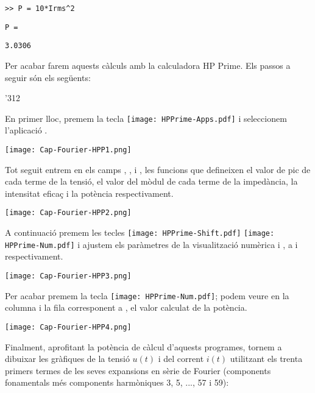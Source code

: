 \begin{exemple}
    \hspace{1cm}\texttt{>{}> P = 10*Irms\^{}2}

    \hspace{1cm}\texttt{P =}

    \hspace{1cm}\texttt{\phantom{Irms }3.0306}\newline


    Per acabar farem aquests càlculs amb la calculadora \textsf{HP Prime}.
     Els passos a seguir són els següents:

    \begin{dingautolist}{'312}

        \item En primer lloc, premem la tecla \texttt{[image: HPPrime-Apps.pdf]} i seleccionem l'aplicació .

             \texttt{[image: Cap-Fourier-HPP1.png]}

        \item Tot seguit entrem en els camps , ,  i , les funcions que defineixen el valor de pic de cada terme de la tensió,  el valor del mòdul de cada terme de la impedància,  la intensitat eficaç i la potència respectivament.

            \texttt{[image: Cap-Fourier-HPP2.png]}

        \item  A continuació premem les tecles \texttt{[image: HPPrime-Shift.pdf]} \texttt{[image: HPPrime-Num.pdf]} i ajustem els paràmetres de la visualització numèrica  i , a  i  respectivament.

            \texttt{[image: Cap-Fourier-HPP3.png]}

        \item Per acabar premem la tecla \texttt{[image: HPPrime-Num.pdf]}; podem veure en la columna  i la fila corresponent a , el valor calculat de la potència.

            \texttt{[image: Cap-Fourier-HPP4.png]}

    \end{dingautolist}

    Finalment, aprofitant la potència de càlcul d'aquests programes, tornem a dibuixar les gràfiques de la tensió $u(t)$ i del corrent $i(t)$ utilitzant els trenta primers termes de les seves expansions en sèrie de Fourier (components fonamentals més components harmòniques 3, 5, ..., 57 i 59):
    \vspace{-2mm}
    \begin{center}
      
    \end{center}


\end{exemple}
